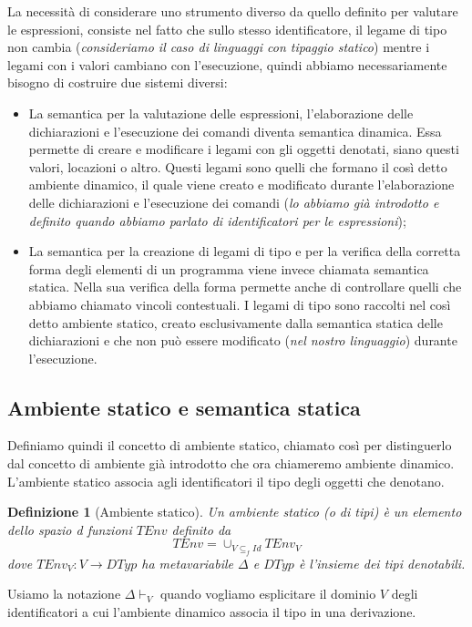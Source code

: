 \documentclass[oneside,a4paper,11pt]{book}
\theoremstyle{italicstyle}
\newtheorem{definizione}{Definizione}[section]
\theoremstyle{normStyle}
\begin{document}
La necessità di considerare uno strumento diverso da quello definito per
valutare le espressioni, consiste nel fatto che sullo stesso identificatore,
il legame di tipo non cambia (\textit{consideriamo il caso di linguaggi con tipaggio
statico}) mentre i legami con i valori cambiano con l’esecuzione, quindi abbiamo
necessariamente bisogno di costruire due sistemi diversi:
\begin{itemize}
  \item La semantica per la valutazione delle espressioni, l’elaborazione delle dichiarazioni e
  l’esecuzione dei comandi diventa semantica dinamica. Essa permette di creare e
  modificare i legami con gli oggetti denotati, siano questi valori, locazioni
  o altro. Questi legami sono quelli che formano il così detto ambiente dinamico,
  il quale viene creato e modificato durante l’elaborazione delle dichiarazioni e
  l’esecuzione dei comandi (\textit{lo abbiamo già introdotto e definito quando abbiamo
  parlato di identificatori per le espressioni});
  \item La semantica per la creazione di legami di tipo e per la verifica
  della corretta forma degli elementi di un programma viene invece chiamata
  semantica statica. Nella sua verifica della forma permette anche di
  controllare quelli che abbiamo chiamato vincoli contestuali. I legami
  di tipo sono raccolti nel così detto ambiente statico, creato esclusivamente
  dalla semantica statica delle dichiarazioni e che non può essere modificato
  (\textit{nel nostro linguaggio}) durante l’esecuzione.
\end{itemize}
\subsection{Ambiente statico e semantica statica}
Definiamo quindi il concetto di ambiente statico, chiamato così per distinguerlo 
dal concetto di ambiente già introdotto che ora chiameremo ambiente dinamico.
L'ambiente statico associa agli identificatori il tipo degli oggetti che denotano.
\begin{definizione}[Ambiente statico]
  Un ambiente statico (o di tipi) è un elemento dello spazio d funzioni $TEnv$ 
  definito da
  \[
    TEnv = \cup_{V \subseteq_f Id}TEnv_V
  \]
  dove $TEnv_V: V \rightarrow DTyp$ ha metavariabile $\Delta$ e $DTyp$ è 
  l'insieme dei tipi denotabili.
\end{definizione}
Usiamo la notazione $\Delta \vdash_V$ quando vogliamo esplicitare il dominio 
$V$ degli identificatori a cui l'ambiente dinamico associa il tipo in una derivazione.
\end{document}
